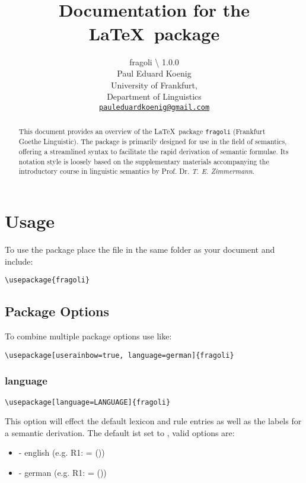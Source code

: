 \documentclass[10pt, a4paper]{article}
\title{\FraGoLi\\Documentation for the \LaTeX\ package \texttt{\her{fragoli}}}
\author{fragoli \textbackslash\text{v} 1.0.0\\Paul Eduard Koenig\\University of Frankfurt,\\Department of Linguistics\\\texttt{\href{mailto:pauleduardkoenig@gmail.com}{pauleduardkoenig@gmail.com}}}
\newenvironment{itemizeexample}{
	\begin{itemize}
		\setlength\itemsep{-.5em}
	}
	{
	\end{itemize}
}
\begin{document}
	\maketitle
	\begin{abstract}
		This document provides an overview of the \LaTeX\ package \texttt{fragoli} (Frankfurt Goethe Linguistic). The package is primarily designed for use in the field of semantics, offering a streamlined syntax to facilitate the rapid derivation of semantic formulae. Its notation style is loosely based on the supplementary materials accompanying the introductory course in linguistic semantics by Prof. Dr. \textit{T. E. Zimmermann}.
	\end{abstract}
	\tableofcontents
	\section{Usage}
	To use the \texttt{} package place the  file in the same folder as your document and include:\\
	\begin{lstlisting}[style=A]
	\usepackage{fragoli}
	\end{lstlisting}
	\subsection{Package Options}
	To combine multiple package options use \her{, } like:
	\begin{lstlisting}[style=A]
	\usepackage[userainbow=true, language=german]{fragoli}
	\end{lstlisting}
	\subsubsection{language}
	\begin{lstlisting}[style=A]
	\usepackage[language=LANGUAGE]{fragoli}
	\end{lstlisting}
	This option will effect the default lexicon and rule entries as well as the labels for a semantic derivation. The default ist set to \texttt{}, valid options are:
	\begin{itemizeexample}
		\item[-] english (e.g. R1:  = (\lambheN{}))
		\item[-] german (e.g. R1:  = (\lambheN{}))
	\end{itemizeexample}
\end{document}
